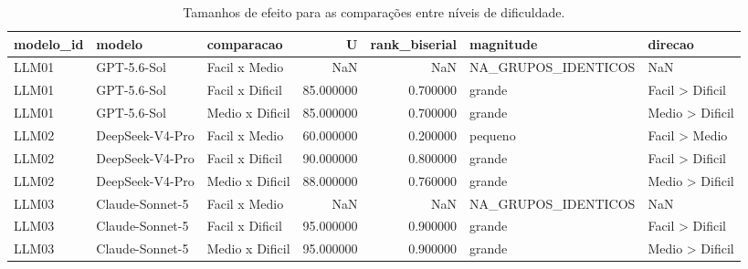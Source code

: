 \begin{table}
\caption{Tamanhos de efeito para as comparações entre níveis de dificuldade.}
\label{tab:tamanhos_efeito}
\begin{tabular}{lllrrll}
\toprule
modelo\_id & modelo & comparacao & U & rank\_biserial & magnitude & direcao \\
\midrule
LLM01 & GPT-5.6-Sol & Facil x Medio & NaN & NaN & NA\_GRUPOS\_IDENTICOS & NaN \\
LLM01 & GPT-5.6-Sol & Facil x Dificil & 85.000000 & 0.700000 & grande & Facil > Dificil \\
LLM01 & GPT-5.6-Sol & Medio x Dificil & 85.000000 & 0.700000 & grande & Medio > Dificil \\
LLM02 & DeepSeek-V4-Pro & Facil x Medio & 60.000000 & 0.200000 & pequeno & Facil > Medio \\
LLM02 & DeepSeek-V4-Pro & Facil x Dificil & 90.000000 & 0.800000 & grande & Facil > Dificil \\
LLM02 & DeepSeek-V4-Pro & Medio x Dificil & 88.000000 & 0.760000 & grande & Medio > Dificil \\
LLM03 & Claude-Sonnet-5 & Facil x Medio & NaN & NaN & NA\_GRUPOS\_IDENTICOS & NaN \\
LLM03 & Claude-Sonnet-5 & Facil x Dificil & 95.000000 & 0.900000 & grande & Facil > Dificil \\
LLM03 & Claude-Sonnet-5 & Medio x Dificil & 95.000000 & 0.900000 & grande & Medio > Dificil \\
\bottomrule
\end{tabular}
\end{table}

